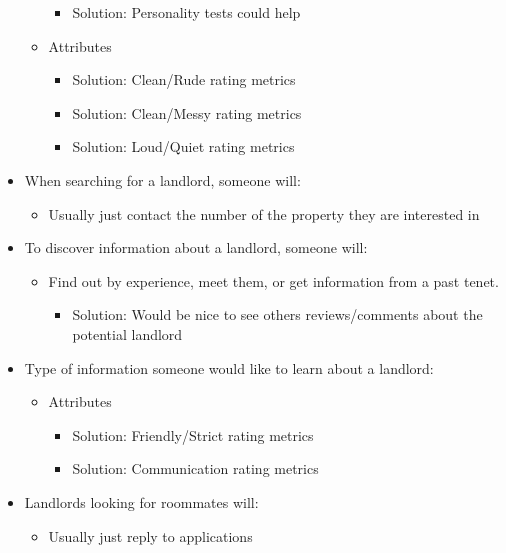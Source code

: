 \documentclass{article}
\begin{document}
\begin{appendices}
\begin{itemize}
\begin{itemize}
\begin{itemize}
                    \item Solution: Personality tests could help
                \end{itemize}
            \item Attributes
                \begin{itemize}
                    \item Solution: Clean/Rude rating metrics
                    \item Solution: Clean/Messy rating metrics
                    \item Solution: Loud/Quiet rating metrics
                \end{itemize}
        \end{itemize}
    \item When searching for a landlord, someone will:
        \begin{itemize}
            \item Usually just contact the number of the property they are interested in
        \end{itemize}
    \item To discover information about a landlord, someone will:
        \begin{itemize}
            \item Find out by experience, meet them, or get information from a past tenet.
            \begin{itemize}
                \item Solution: Would be nice to see others reviews/comments about the potential landlord
            \end{itemize}
        \end{itemize}
    \item Type of information someone would like to learn about a landlord:
        \begin{itemize}
            \item Attributes
            \begin{itemize}
                \item Solution: Friendly/Strict rating metrics
                \item Solution: Communication rating metrics
            \end{itemize}
        \end{itemize}
    \item Landlords looking for roommates will:
        \begin{itemize}
            \item Usually just reply to applications

\end{itemize}
\end{itemize}
\end{appendices}
\end{document}
